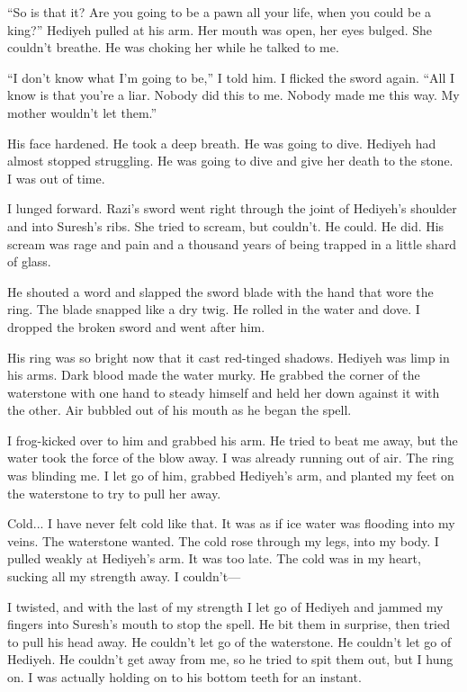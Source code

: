 ``So is that it?  Are you going to be a pawn all your life, when you
could be a king?''  Hediyeh pulled at his arm.  Her mouth was open, her
eyes bulged.  She couldn't breathe.  He was choking her while he
talked to me.

``I don't know what I'm going to be,'' I told him.  I flicked the sword
again.  ``All I know is that you're a liar.  Nobody did this to me.
Nobody made me this way.  My mother wouldn't let them.''

His face hardened.  He took a deep breath.  He was going to dive.
Hediyeh had almost stopped struggling.  He was going to dive and give
her death to the stone.  I was out of time.

I lunged forward.  Razi's sword went right through the joint of
Hediyeh's shoulder and into Suresh's ribs.  She tried to scream, but
couldn't.  He could.  He did.  His scream was rage and pain and a
thousand years of being trapped in a little shard of glass.

He shouted a word and slapped the sword blade with the hand that wore
the ring.  The blade snapped like a dry twig.  He rolled in the water
and dove.  I dropped the broken sword and went after him.

His ring was so bright now that it cast red-tinged shadows.  Hediyeh
was limp in his arms.  Dark blood made the water murky.  He grabbed
the corner of the waterstone with one hand to steady himself and held
her down against it with the other.  Air bubbled out of his mouth as
he began the spell.

I frog-kicked over to him and grabbed his arm.  He tried to beat me
away, but the water took the force of the blow away.  I was already
running out of air.  The ring was blinding me.  I let go of him,
grabbed Hediyeh's arm, and planted my feet on the waterstone to try to
pull her away.

Cold... I have never felt cold like that.  It was as if ice water was
flooding into my veins.  The waterstone wanted.  The cold rose through
my legs, into my body.  I pulled weakly at Hediyeh's arm.  It was too
late.  The cold was in my heart, sucking all my strength away.  I
couldn't---

I twisted, and with the last of my strength I let go of Hediyeh and
jammed my fingers into Suresh's mouth to stop the spell.  He bit them
in surprise, then tried to pull his head away.  He couldn't let go of
the waterstone.  He couldn't let go of Hediyeh.  He couldn't get away
from me, so he tried to spit them out, but I hung on.  I was actually
holding on to his bottom teeth for an instant.

